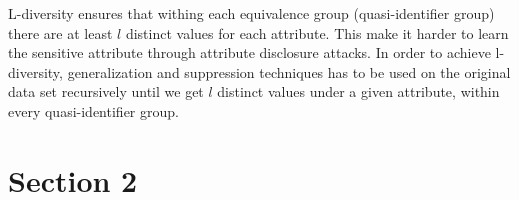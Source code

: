 \documentclass[11pt,letterpaper]{article}
\newenvironment{answer}{\em \color{blue} \begin{adjustwidth}{1cm}{1cm}}{\end{adjustwidth}}
\begin{document}
\begin{enumerate}
		\begin{answer}
			L-diversity ensures that withing each equivalence group (quasi-identifier group) there are at least $l$ distinct values for each attribute. This make it harder to learn the sensitive attribute through attribute disclosure attacks. In order to achieve l-diversity, generalization and suppression techniques has to be used on the original data set recursively until we get $l$ distinct values under a given attribute, within every quasi-identifier group.
		\end{answer}
		
	\end{enumerate}

	\section*{Section 2}
\end{document}
